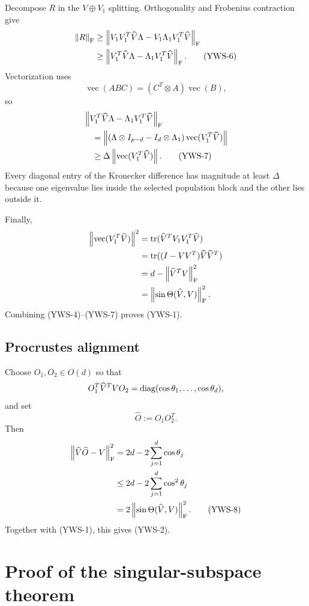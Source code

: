 Decompose $R$ in the $V\oplus V_1$ splitting. Orthogonality and Frobenius contraction give
\begin{align}
  \left\lVert R\right\rVert_{\mathrm{F}}
  &\ge
  \left\lVert V_1V_1^T\widehat V\Lambda-
        V_1\Lambda_1V_1^T\widehat V\right\rVert_{\mathrm{F}}\notag\\
  &\ge
  \left\lVert V_1^T\widehat V\Lambda-
        \Lambda_1V_1^T\widehat V\right\rVert_{\mathrm{F}}. \tag{YWS-6}
\end{align}
Vectorization uses
\[
  \operatorname{vec}(ABC)
  =(C^T\otimes A)\operatorname{vec}(B),
\]
so
\begin{align}
 &\left\lVert V_1^T\widehat V\Lambda-
        \Lambda_1V_1^T\widehat V\right\rVert_{\mathrm{F}}\notag\\
 &\quad=
 \left\lVert (\Lambda\otimes I_{p-d}-I_d\otimes\Lambda_1)
       \operatorname{vec}(V_1^T\widehat V)\right\rVert\notag\\
 &\quad\ge
 \Delta\left\lVert \operatorname{vec}(V_1^T\widehat V)\right\rVert. \tag{YWS-7}
\end{align}
Every diagonal entry of the Kronecker difference has magnitude at least $\Delta$ because one eigenvalue lies inside the selected population block and the other lies outside it.

Finally,
\begin{align*}
  \left\lVert \operatorname{vec}(V_1^T\widehat V)\right\rVert^2
  &=\operatorname{tr}(\widehat V^TV_1V_1^T\widehat V)\\
  &=\operatorname{tr}((I-VV^T)\widehat V\widehat V^T)\\
  &=d-\left\lVert \widehat V^TV\right\rVert_{\mathrm{F}}^2\\
  &=\left\lVert \sin\Theta(\widehat V,V)\right\rVert_{\mathrm{F}}^2.
\end{align*}
Combining (YWS-4)--(YWS-7) proves (YWS-1).

\subsection{Procrustes alignment}

Choose $O_1,O_2\in O(d)$ so that
\[
  O_1^T\widehat V^TVO_2
  =\operatorname{diag}(\cos\theta_1,\dots,\cos\theta_d),
\]
and set
\[
  \widehat O:=O_1O_2^T.
\]
Then
\begin{align}
  \left\lVert \widehat V\widehat O-V\right\rVert_{\mathrm{F}}^2
  &=2d-2\sum_{j=1}^d\cos\theta_j\notag\\
  &\le2d-2\sum_{j=1}^d\cos^2\theta_j\notag\\
  &=2\left\lVert \sin\Theta(\widehat V,V)\right\rVert_{\mathrm{F}}^2. \tag{YWS-8}
\end{align}
Together with (YWS-1), this gives (YWS-2).

\section{Proof of the singular-subspace theorem}

